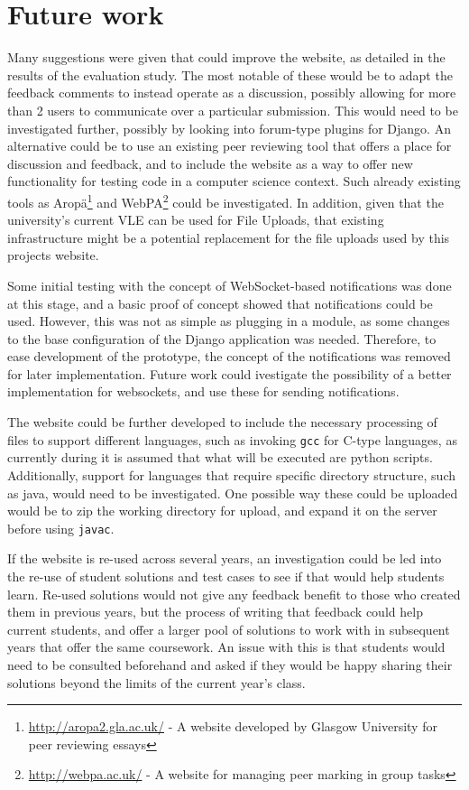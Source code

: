 \documentclass[a4paper,11pt]{report}
\begin{document}
\section{Future work}
Many suggestions were given that could improve the website, as detailed in the results of the evaluation study. The most notable of these would be to adapt the feedback comments to instead operate as a discussion, possibly allowing for more than 2 users to communicate over a particular submission. This would need to be investigated further, possibly by looking into forum-type plugins for Django. An alternative could be to use an existing peer reviewing tool that offers a place for discussion and feedback, and to include the website as a way to offer new functionality for testing code in a computer science context. Such already existing tools as Arop\"a\footnote{\url{http://aropa2.gla.ac.uk/} - A website developed by Glasgow University for peer reviewing essays} and WebPA\footnote{\url{http://webpa.ac.uk/} - A website for managing peer marking in group tasks} could be investigated. In addition, given that the university's current VLE can be used for File Uploads, that existing infrastructure might be a potential replacement for the file uploads used by this projects website.\par
Some initial testing with the concept of WebSocket-based notifications was done at this stage, and a basic proof of concept showed that notifications could be used. However, this was not as simple as plugging in a module, as some changes to the base configuration of the Django application was needed. Therefore, to ease development of the prototype, the concept of the notifications was removed for later implementation. Future work could ivestigate the possibility of a better implementation for websockets, and use these for sending notifications.\par
The website could be further developed to include the necessary processing of files to support different languages, such as invoking \texttt{gcc} for C-type languages, as currently during it is assumed that what will be executed are python scripts. Additionally, support for languages that require specific directory structure, such as java, would need to be investigated. One possible way these could be uploaded would be to zip the working directory for upload, and expand it on the server before using \texttt{javac}.\par
If the website is re-used across several years, an investigation could be led into the re-use of student solutions and test cases to see if that would help students learn. Re-used solutions would not give any feedback benefit to those who created them in previous years, but the process of writing that feedback could help current students, and offer a larger pool of solutions to work with in subsequent years that offer the same coursework. An issue with this is that students would need to be consulted beforehand and asked if they would be happy sharing their solutions beyond the limits of the current year's class.\par
\end{document}

